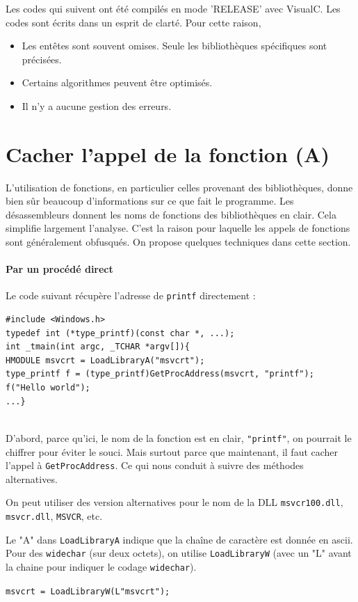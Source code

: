 \documentclass{book}
\newenvironment{commentaire}[1]{%
	\def\FrameCommand{\fboxrule=\FrameRule\fboxsep=\FrameSep \fcolorbox{yellow!50}{yellow!10}}%
	\MakeFramed {\advance\hsize-\width \FrameRestore}
	\noindent {\bf #1}\\
}%
{\endMakeFramed}
\newcommand{\code}[1]{\texttt{#1}}
\begin{document}
Les codes qui suivent ont été compilés en mode 'RELEASE' avec VisualC.  Les codes sont écrits dans un esprit de clarté. Pour cette raison, 
\begin{itemize}
	\item Les entêtes sont souvent omises. Seule les bibliothèques spécifiques sont précisées. 
	\item Certains algorithmes peuvent être optimisés. 
	\item Il n'y a aucune gestion des erreurs. 
\end{itemize}


\section{Cacher l'appel de la fonction (A)}

L'utilisation de fonctions, en particulier celles provenant des bibliothèques, donne bien sûr beaucoup d'informations sur ce que fait le programme. Les désassembleurs donnent les noms de fonctions des bibliothèques en clair. Cela simplifie largement l'analyse. C'est la raison pour laquelle les appels de fonctions sont généralement obfusqués. On propose quelques techniques dans cette section. 

\paragraph{Par un procédé direct}

Le code suivant récupère l'adresse de \code{printf} directement : 

\begin{verbatim}
#include <Windows.h>
typedef int (*type_printf)(const char *, ...);
int _tmain(int argc, _TCHAR *argv[]){
HMODULE msvcrt = LoadLibraryA("msvcrt");
type_printf f = (type_printf)GetProcAddress(msvcrt, "printf");
f("Hello world");
...}
\end{verbatim}

\begin{commentaire}{Mais, ce n'est pas très discret}
	D'abord, parce qu'ici, le nom de la fonction est en clair, \code{"printf"}, on pourrait le chiffrer pour éviter le souci. Mais surtout parce que maintenant, il faut cacher l'appel à \code{GetProcAddress}. Ce qui nous conduit à suivre des méthodes alternatives. 
	
	\medskip On peut utiliser des version alternatives pour le nom de la DLL \code{msvcr100.dll}, \code{msvcr.dll}, \code{MSVCR}, etc. 
	
	\medskip Le "A" dans \code{LoadLibraryA} indique que la chaîne de caractère est donnée en {\sc ascii}. Pour des \code{widechar} (sur deux octets), on utilise \code{LoadLibraryW} (avec un "L" avant la chaine pour indiquer le codage \code{widechar}). 
	
	\vspace{1ex}
\noindent	\texttt{msvcrt = LoadLibraryW(L"msvcrt");}
\end{commentaire}
\end{document}
